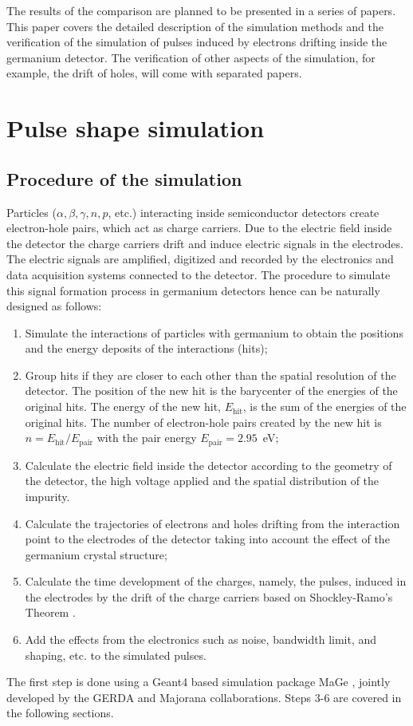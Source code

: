 \documentclass[epj]{svjour}
\begin{document}
The results of the comparison are planned to be presented in a series
of papers. This paper covers the detailed description of the
simulation methods and the verification of the simulation of pulses
induced by electrons drifting inside the germanium detector. The
verification of other aspects of the simulation, for example, the
drift of holes, will come with separated papers.

\section{Pulse shape simulation}
\label{s:pss}
\subsection{Procedure of the simulation}
\label{s:proc}
Particles ($\alpha, \beta, \gamma, n, p$, etc.) interacting inside
semiconductor detectors create electron-hole pairs, which act as
charge carriers. Due to the electric field inside the detector the
charge carriers drift and induce electric signals in the
electrodes. The electric signals are amplified, digitized and recorded
by the electronics and data acquisition systems connected to the
detector. The procedure to simulate this signal formation process in
germanium detectors hence can be naturally designed as follows:
\begin{enumerate} 
\item Simulate the interactions of particles with germanium to obtain
the positions and the energy deposits of the interactions (hits);
\item Group hits if they are closer to each other than the spatial
resolution of the detector. The position of the new hit is the
barycenter of the energies of the original hits. The energy of the new
hit, $E_{\mbox{hit}}$, is the sum of the energies of the original
hits. The number of electron-hole pairs created by the new hit is $n =
E_{\mbox{hit}} / E_{\mbox{pair}}$ with the pair energy
$E_{\mbox{pair}} = 2.95$~eV;
\item Calculate the electric field inside the detector according to
the geometry of the detector, the high voltage applied and the spatial
distribution of the impurity.
\item Calculate the trajectories of electrons and holes drifting from
the interaction point to the electrodes of the detector taking into
account the effect of the germanium crystal structure;
\item Calculate the time development of the charges, namely, the
pulses, induced in the electrodes by the drift of the charge carriers
based on Shockley-Ramo's Theorem \cite{Gat82,Rad88,He00}.
\item Add the effects from the electronics such as noise, bandwidth
limit, and shaping, etc. to the simulated pulses.
\end{enumerate} 
The first step is done using a Geant4 \cite{G403,G406} based
simulation package MaGe \cite{MaGe}, jointly developed by the GERDA
and Majorana collaborations. Steps 3-6 are covered in the following
sections.
\end{document}
